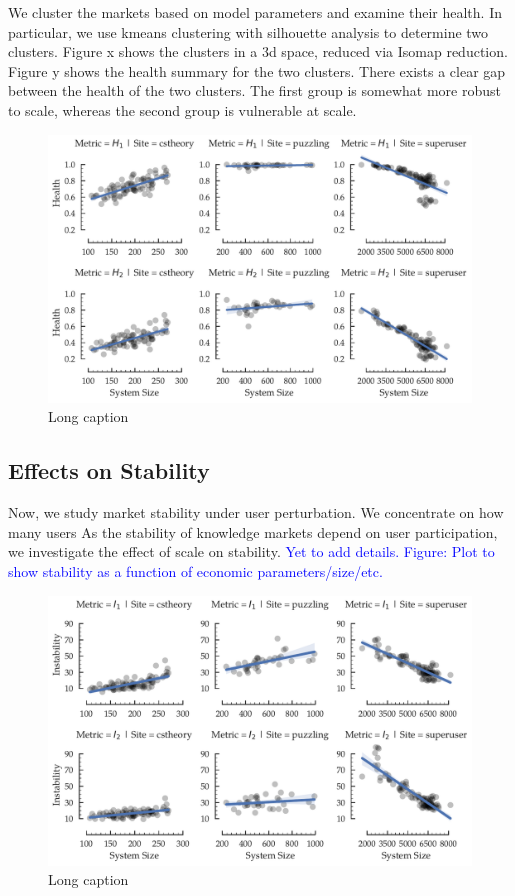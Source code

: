 We cluster the markets based on model parameters and examine their health. In particular, we use kmeans clustering with silhouette analysis to determine two clusters. Figure x shows the clusters in a 3d space, reduced via Isomap reduction. Figure y shows the health summary for the two clusters. There exists a clear gap between the health of the two clusters. The first group is somewhat more robust to scale, whereas the second group is vulnerable at scale.

\begin{figure}[hbt]
\vspace{-0.5\baselineskip}
\centering
\includegraphics[scale=0.38]{Figures/Size_vs_Health.pdf}
\vspace{-2\baselineskip}
\caption{Long caption}
\vspace{-\baselineskip}
\label{fig:health}
\end{figure}

\subsection{Effects on Stability}
Now, we study market stability under user perturbation. We concentrate on how many users
As the stability of knowledge markets depend on user participation, we investigate the effect of scale on stability. \textcolor{blue}{Yet to add details. Figure: Plot to show stability as a function of economic parameters/size/etc.}

\begin{figure}[hbt]
\vspace{-0.5\baselineskip}
\centering
\includegraphics[scale=0.38]{Figures/Size_vs_Instability.pdf}
\vspace{-2\baselineskip}
\caption{Long caption}
\vspace{-\baselineskip}
\label{fig:stability}
\end{figure}


